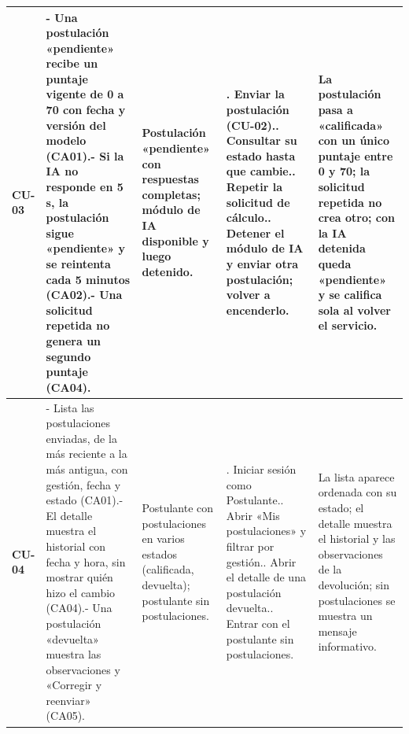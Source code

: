 {\begin{longtable}{@{}>{\raggedright\arraybackslash}p{1.2cm}>{\raggedright\arraybackslash}p{3.7cm}>{\raggedright\arraybackslash}p{3.0cm}>{\raggedright\arraybackslash}p{4.4cm}>{\raggedright\arraybackslash}p{3.4cm}@{}}
\midrule
\textbf{CU-03} & - Una postulación «pendiente» recibe un puntaje vigente de 0 a 70 con fecha y versión del modelo (CA01).\newline - Si la IA no responde en 5 s, la postulación sigue «pendiente» y se reintenta cada 5 minutos (CA02).\newline - Una solicitud repetida no genera un segundo puntaje (CA04). & Postulación «pendiente» con respuestas completas; módulo de IA disponible y luego detenido. & 1. Enviar la postulación (CU-02).\newline 2. Consultar su estado hasta que cambie.\newline 3. Repetir la solicitud de cálculo.\newline 4. Detener el módulo de IA y enviar otra postulación; volver a encenderlo. & La postulación pasa a «calificada» con un único puntaje entre 0 y 70; la solicitud repetida no crea otro; con la IA detenida queda «pendiente» y se califica sola al volver el servicio. \\
\midrule
\textbf{CU-04} & - Lista las postulaciones enviadas, de la más reciente a la más antigua, con gestión, fecha y estado (CA01).\newline - El detalle muestra el historial con fecha y hora, sin mostrar quién hizo el cambio (CA04).\newline - Una postulación «devuelta» muestra las observaciones y «Corregir y reenviar» (CA05). & Postulante con postulaciones en varios estados (calificada, devuelta); postulante sin postulaciones. & 1. Iniciar sesión como Postulante.\newline 2. Abrir «Mis postulaciones» y filtrar por gestión.\newline 3. Abrir el detalle de una postulación devuelta.\newline 4. Entrar con el postulante sin postulaciones. & La lista aparece ordenada con su estado; el detalle muestra el historial y las observaciones de la devolución; sin postulaciones se muestra un mensaje informativo. \\
\midrule

\end{longtable}}
